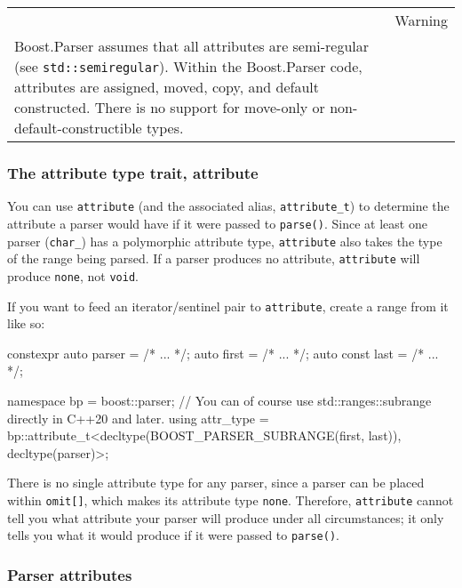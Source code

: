 \begin{longtable}[]{@{}
  >{\raggedright\arraybackslash}p{}
  >{\raggedright\arraybackslash}p{}@{}}
\toprule\noalign{}
\endhead
\bottomrule\noalign{}
\endlastfoot
\begin{minipage}[t]{\linewidth}\raggedright
\end{minipage} & Warning \\
Boost.Parser assumes that all attributes are semi-regular (see \texttt{std::semiregular}). Within the Boost.Parser code, attributes are assigned, moved, copy, and default constructed. There is no support for move-only or non-default-constructible types. & \\
\end{longtable}

\subsubsection{The attribute type trait, attribute}

You can use \texttt{attribute} (and the associated alias, \texttt{attribute\_t}) to determine the attribute a parser would have if it were passed to \texttt{parse()}. Since at least one parser (\texttt{char\_}) has a polymorphic attribute type, \texttt{attribute} also takes the type of the range being parsed. If a parser produces no attribute, \texttt{attribute} will produce \texttt{none}, not \texttt{void}.

If you want to feed an iterator/sentinel pair to \texttt{attribute}, create a range from it like so:

\begin{code}
constexpr auto parser = /* ... */;
auto first = /* ... */;
auto const last = /* ... */;

namespace bp = boost::parser;
// You can of course use std::ranges::subrange directly in C++20 and later.
using attr_type = bp::attribute_t<decltype(BOOST_PARSER_SUBRANGE(first, last)), decltype(parser)>;
\end{code}

There is no single attribute type for any parser, since a parser can be placed within \texttt{omit{[}{]}}, which makes its attribute type \texttt{none}. Therefore, \texttt{attribute} cannot tell you what attribute your parser will produce under all circumstances; it only tells you what it would produce if it were passed to \texttt{parse()}.

\subsubsection{Parser attributes}

